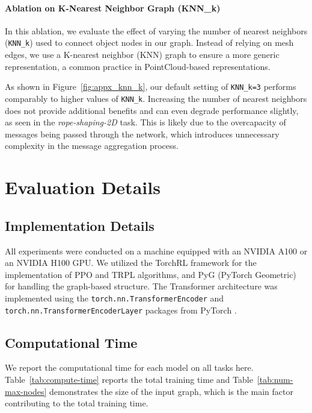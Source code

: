 

\paragraph{Ablation on K-Nearest Neighbor Graph (KNN\_k)}

In this ablation, we evaluate the effect of varying the number of nearest neighbors (\texttt{KNN\_k}) used to connect object nodes in our graph. Instead of relying on mesh edges, we use a K-nearest neighbor (KNN) graph to ensure a more generic representation, a common practice in PointCloud-based representations.

As shown in Figure~\ref{fig:appx_knn_k}, our default setting of \texttt{KNN\_k=3} performs comparably to higher values of \texttt{KNN\_k}. Increasing the number of nearest neighbors does not provide additional benefits and can even degrade performance slightly, as seen in the \textit{rope-shaping-2D} task. This is likely due to the overcapacity of messages being passed through the network, which introduces unnecessary complexity in the message aggregation process.

\section{Evaluation Details}
\label{appx:eval_details}
\subsection{Implementation Details}

All experiments were conducted on a machine equipped with an NVIDIA A100 or an NVIDIA H100 GPU. We utilized the TorchRL framework \citep{bou2023torchrl} for the implementation of PPO and TRPL algorithms, and PyG (PyTorch Geometric) \citep{pyg} for handling the graph-based structure. The Transformer architecture was implemented using the \texttt{torch.nn.TransformerEncoder} and \texttt{torch.nn.TransformerEncoderLayer} packages from PyTorch \citep{torch}.

\subsection{Computational Time}

We report the computational time for each model on all tasks here. Table~\ref{tab:compute-time} reports the total training time and Table~\ref{tab:num-max-nodes} demonstrates the size of the input graph, which is the main factor contributing to the total training time.

